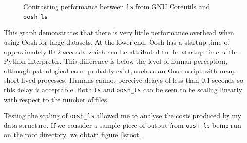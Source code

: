 \documentclass[12pt,twoside,notitlepage]{report}
\begin{document}
\begin{figure}[h]
  \centering
  \setlength\fboxsep{0.5pt}
  \setlength\fboxrule{0.5pt}
  \caption{Contrasting performance between {\tt ls} from GNU Coreutils
    and {\tt oosh\_ls}}
\label{lsspeed}
\end{figure}

This graph demonstrates that there is very little performance overhead
when using Oosh for large datasets. At the lower end, Oosh has a
startup time of approximately 0.02 seconds which can be attributed to
the startup time of the Python interpreter. This difference is below
the level of human perception, although pathological cases probably
exist, such as an Oosh script with many short lived processes. Humans
cannot perceive delays of less than 0.1 seconds \cite{hci} so this
delay is acceptable. Both {\tt ls} and {\tt oosh\_ls} can be seen to
be scaling linearly with respect to the number of files.

Testing the scaling of {\tt oosh\_ls} allowed me to analyse the costs
produced by my data structure. If we consider a sample piece of output
from {\tt oosh\_ls} being run on the root directory, we obtain figure
\ref{lsroot}.
\end{document}
